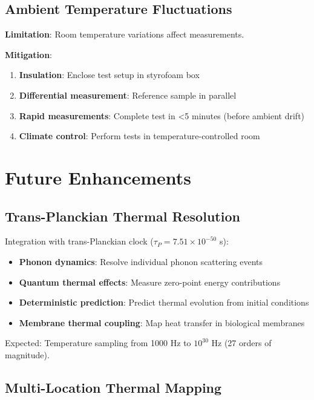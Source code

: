 \documentclass[12pt,a4paper]{article}
\begin{document}
{{\subsection{Ambient Temperature Fluctuations}

\textbf{Limitation}: Room temperature variations affect measurements.

\textbf{Mitigation}:
\begin{enumerate}
\item \textbf{Insulation}: Enclose test setup in styrofoam box
\item \textbf{Differential measurement}: Reference sample in parallel
\item \textbf{Rapid measurements}: Complete test in <5 minutes (before ambient drift)
\item \textbf{Climate control}: Perform tests in temperature-controlled room
\end{enumerate}

\section{Future Enhancements}

\subsection{Trans-Planckian Thermal Resolution}

Integration with trans-Planckian clock ($\tau_P = 7.51 \times 10^{-50}$ s):

\begin{itemize}
\item \textbf{Phonon dynamics}: Resolve individual phonon scattering events
\item \textbf{Quantum thermal effects}: Measure zero-point energy contributions
\item \textbf{Deterministic prediction}: Predict thermal evolution from initial conditions
\item \textbf{Membrane thermal coupling}: Map heat transfer in biological membranes
\end{itemize}

Expected: Temperature sampling from 1000 Hz to $10^{30}$ Hz (27 orders of magnitude).

\subsection{Multi-Location Thermal Mapping}

}}
\end{document}

